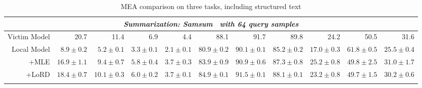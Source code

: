 \documentclass[letterpaper]{article} %
\newcommand{\red}{\cellcolor{lzred!68} } %
\newcommand{\gret}{\cellcolor{lzred!48} } %
\newcommand{\gres}{\cellcolor{lzred!28} } %
\newcommand{\grem}{\cellcolor{lzgreen!18} } %
\newcommand{\grel}{\cellcolor{lzgreen!38} } %
\newcommand{\grexl}{\cellcolor{lzgreen!68} } %
\newcommand{\greyc}{\cellcolor{lzgrey!28} }
\begin{document}
\begin{table*}[t]
{\begin{tabular}{r|rrrrrrrrrr}
\multicolumn{11}{c}{\emph{Summarization: Samsum~\citep{samsum} with 64 query samples}}                                                                             \\\hline
Victim Model & \greyc 20.7& \greyc 11.4& \greyc 6.9& \greyc 4.4& \greyc 88.1& \greyc 91.7& \greyc 89.8& \greyc 24.2& \greyc 50.5& \greyc 31.6\\
Local Model  & \red  $8.9\pm 0.2$& \gret  $5.2\pm 0.1$& \gres   $3.3\pm 0.1$& \grem  $2.1\pm 0.1$& \gret  $80.9\pm 0.2$& \grem  $90.1\pm 0.1$& \gres  $85.2\pm 0.2$& \gret  $17.0\pm 0.3$& \grexl  $61.8\pm 0.5$& \gret  $25.5\pm 0.4$\\
+MLE         & \gres  $16.9\pm 1.1$& \gres  $9.4\pm 0.7$& \grem  $5.8\pm 0.4$& \grel  $3.7\pm 0.3$& \gret  $83.9\pm 0.9$& \grel  $90.9\pm 0.6$& \grem  $87.3\pm 0.8$& \grel  $25.2\pm 0.8$& \grel  $49.8\pm 2.5$  & \grel   $31.0\pm 1.7$\\
+LoRD        & \grem  $18.4\pm 0.7$& \grem  $10.1\pm 0.3$& \grel  $6.0\pm 0.2$& \grel  $3.7\pm 0.1$& \gres  $84.9\pm 0.1$& \grel  $91.5\pm 0.1$& \grem  $88.1\pm 0.1$& \grel  $23.2\pm 0.8$& \grel  $49.7\pm 1.5$  & \grem   $30.2\pm 0.6$\\
\Xhline{1.5pt}
\end{tabular}%
}
\caption{MEA comparison on three tasks, including structured text}
\label{tab:domain-res}
\end{table*}
\end{document}
